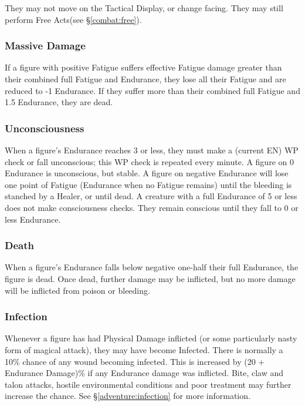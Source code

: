 \begin{multicols*}{3}
\begin{Itemize}
\item They may not move on the Tactical Display, or change facing. They
may still perform Free Acts(see \S\ref{combat:free}).
\end{Itemize}

\subsubsection{Massive Damage}

If a figure with positive Fatigue suffers effective Fatigue damage
greater than their combined full Fatigue and Endurance, they lose all
their Fatigue and are reduced to -1 Endurance. If they suffer more
than their combined full Fatigue and 1.5  \x  Endurance, they are dead.

\subsubsection{Unconsciousness}

When a figure's Endurance reaches 3 or less, they must make a (current
EN)  \x  WP check or fall unconscious; this WP check is repeated every
minute. A figure on 0 Endurance is unconscious, but stable. A figure
on negative Endurance will lose one point of Fatigue (Endurance when
no Fatigue remains) until the bleeding is stanched by a Healer, or
until dead. A creature with a full Endurance of 5 or less does not
make consciousness checks. They remain conscious until they fall to 0
or less Endurance.

\subsubsection{Death}

When a figure's Endurance falls below negative one-half their full
Endurance, the figure is dead. Once dead, further damage may be
inflicted, but no more damage will be inflicted from poison or
bleeding.

\subsubsection{Infection}

Whenever a figure has had Physical Damage inflicted (or some
particularly nasty form of magical attack), they may have become
Infected. There is normally a 10\% chance of any wound becoming
infected. This is increased by (20 + Endurance Damage)\% if any
Endurance damage was inflicted. Bite, claw and talon attacks, hostile
environmental conditions and poor treatment may further increase the
chance.  See \S\ref{adventure:infection} for more information.


\end{multicols*}
